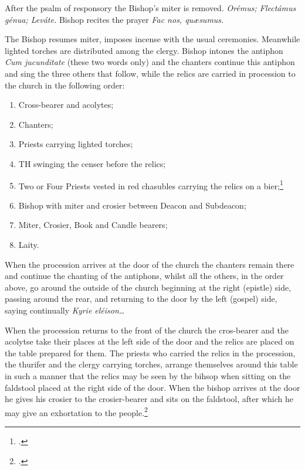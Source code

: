 \documentclass[letterpaper]{report}
\newcommand\src{\textsc{S.R.C.}}
\begin{document}
{\rubric After the psalm of responsory the Bishop's miter is removed.
\textit{Orémus; Flectámus génua; Leváte.} Bishop recites the prayer \textit{Fac
nos, qu\ae sumus.}

\rubric The Bishop resumes miter, imposes incense with the usual ceremonies.
Meanwhile lighted torches are distributed among the clergy. Bishop intones the
antiphon \textit{Cum jucunditate} (these two words only) and the chanters
continue this antiphon and sing the three others that follow, while the relics
are carried in procession to the church in the following order:

\begin{enumerate}
    \item Cross-bearer and acolytes;
    \item Chanters;
    \item Priests carrying lighted torches;
    \item TH swinging the censer before the relics;
    \item Two or Four Priests vested in red chasubles carrying the relics on a
        bier;\footcite[Instead of these priets the consecrator may carry the
        relics on s salver.][footnote 1, p. 81.]{consecranda}
    \item Bishop with miter and crosier between Deacon and Subdeacon;
    \item Miter, Crosier, Book and Candle bearers;
    \item Laity.
\end{enumerate}

When the procession arrives at the door of the church the chanters remain there
and continue the chanting of the antiphons, whilst all the others, in the order
above, go around the outside of the church beginning at the right (epistle)
side, passing around the rear, and returning to the door by the left (gospel)
side, saying continually \textit{Kyrie eléison\dots}

\rubric When the procession returns to the front of the church the cros-bearer
and the acolytse take their places at the left side of the door and the relics
are placed on the table prepared for them. The priests who carried the relics
in the procession, the thurifer and the clergy carrying torches, arrange
themselves around this table in such a manner that the relics may be seen by
the bihsop when sitting on the faldstool placed at the right side of the door.
When the bishop arrives at the door he gives his crosier to the crosier-bearer
and sits on the faldstool, after which he may give an exhortation to the
people.\footcite[The exhortation here spoken of, the decrees of the Council of
Trent which according to the Pontifical are now read by the archdeacon (any
priest), the address of the Bishop to the founder of the church and the
latter's reply may be omitted. --- \src, May 17, 1890, n. 3729 ad
VIII.][footnote 2, p. 82.]{consecranda}

}
\end{document}
